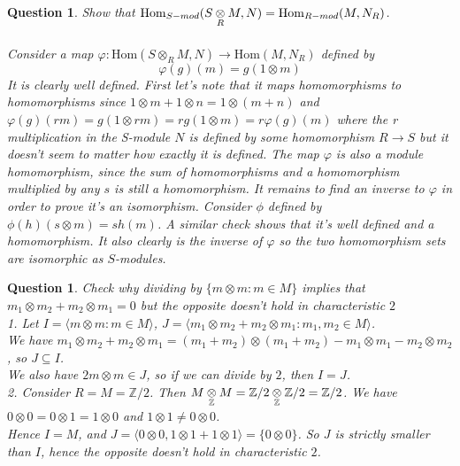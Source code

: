 \documentclass[a4paper]{article}
\newtheorem{que}[thm]{Question}
\begin{document}
\begin{que} Show that $\operatorname{Hom}_{S-mod}(S \mathbin{\mathop{\otimes}\limits_{R}} M, N) = \operatorname{Hom}_{R-mod}(M, N_R)$.\\\\
 Consider a map $\varphi:\text{Hom}\left( S\otimes_R M,  N  \right) \to \text{Hom}\left( M,N_R \right) $ defined by \[\varphi\left( g \right) \left( m \right)=g\left( 1\otimes m \right)  \]
 It is clearly well defined. First let's note that it maps homomorphisms to homomorphisms since $1\otimes m+1\otimes n=1\otimes \left( m+n \right) $ and $\varphi(g)(rm)=g(1\otimes rm)=rg\left( 1\otimes m \right)=r\varphi(g)(m) $ where the r multiplication in the S-module $N$ is defined by some homomorphism $R\to S$ but it doesn't seem to matter how exactly it is defined. The map $\varphi$ is also a module homomorphism, since the sum of homomorphisms and a homomorphism multiplied by any $s$ is still a homomorphism. It remains to find an inverse to $\varphi$ in order to prove it's an isomorphism. Consider $\phi$ defined by $\phi(h)(s\otimes m)=sh(m)$. A similar check shows that it's well defined and a homomorphism. It also clearly is the inverse of $\varphi$ so the two homomorphism sets are isomorphic as $S$-modules.

\end{que}
\begin{que} Check why dividing by $\{m \otimes m : m \in M\}$ implies that $m_1 \otimes m_2 + m_2 \otimes m_1 = 0$ but the opposite doesn't hold in characteristic $2$\\
	
	1. Let $I = \langle{m \otimes m : m \in M}\rangle$, $J = \langle{m_1 \otimes m_2 + m_2 \otimes m_1: m_1, m_2 \in M}\rangle$.\\
	We have $m_1 \otimes m_2 + m_2 \otimes m_1 = (m_1 + m_2) \otimes (m_1 + m_2) - m_1 \otimes m_1 - m_2 \otimes m_2$, so $J \subseteq I$.\\
	We also have $2 m \otimes m \in J$, so if we can divide by $2$, then $I = J$.\\
	2. Consider $R = M = \mathbb{Z}/2$. Then $M \mathbin{\mathop{\otimes}\limits_{\mathbb{Z}}} M = \mathbb{Z}/2 \mathbin{\mathop{\otimes}\limits_{\mathbb{Z}}} \mathbb{Z}/2 = \mathbb{Z}/2$.
	We have $0 \otimes 0 = 0 \otimes 1 = 1 \otimes 0$ and $1 \otimes 1 \neq 0 \otimes 0$.\\
	Hence $I = M$, and $J = \langle 0 \otimes 0, 1 \otimes 1 + 1 \otimes 1 \rangle = \{0 \otimes 0\}$. So $J$ is strictly smaller than $I$, hence the opposite doesn't hold in characteristic $2$.
	
	
   \end{que}
\end{document}
